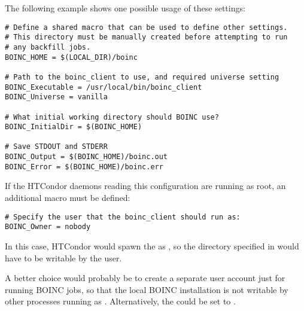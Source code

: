 The following example shows one possible usage of these settings:

\footnotesize
\begin{verbatim}
# Define a shared macro that can be used to define other settings.
# This directory must be manually created before attempting to run
# any backfill jobs.
BOINC_HOME = $(LOCAL_DIR)/boinc

# Path to the boinc_client to use, and required universe setting
BOINC_Executable = /usr/local/bin/boinc_client
BOINC_Universe = vanilla

# What initial working directory should BOINC use?
BOINC_InitialDir = $(BOINC_HOME)

# Save STDOUT and STDERR
BOINC_Output = $(BOINC_HOME)/boinc.out
BOINC_Error = $(BOINC_HOME)/boinc.err
\end{verbatim}
\normalsize

If the HTCondor daemons reading this configuration are running as root,
an additional macro must be defined:

\footnotesize
\begin{verbatim}
# Specify the user that the boinc_client should run as:
BOINC_Owner = nobody
\end{verbatim}
\normalsize

In this case, HTCondor would spawn the  as
, so the directory specified in 
would have to be writable by the  user.

A better choice would probably be to create a separate user account
just for running BOINC jobs, so that the local BOINC installation is
not writable by other processes running as .
Alternatively, the  could be set to
. 

\noindent {}

